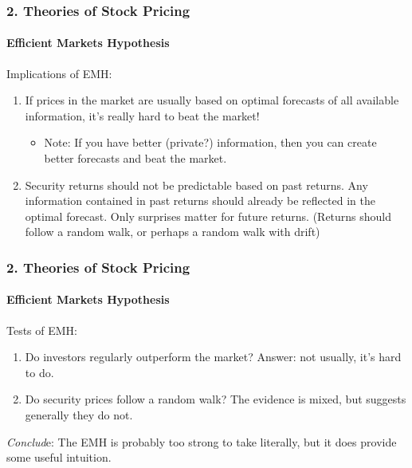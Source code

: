 \documentclass{beamer}
\begin{document}
\begin{frame}[t]
    \frametitle{2. Theories of Stock Pricing}
    \framesubtitle{Efficient Markets Hypothesis}

Implications of EMH:

    \begin{enumerate}
        \item If prices in the market are usually based on optimal forecasts of all available information, it’s really hard to beat the market!
        \begin{itemize}
            \item Note: If you have better (private?) information, then you can create better forecasts and beat the market.
        \end{itemize}
        \item Security returns should not be predictable based on past returns.   Any information contained in past returns should already be reflected in the optimal forecast.   Only surprises matter for future returns.   (Returns should follow a random walk, or perhaps a random walk with drift)
    \end{enumerate}

\end{frame}

\begin{frame}[t]
    \frametitle{2. Theories of Stock Pricing}
    \framesubtitle{Efficient Markets Hypothesis}

    Tests of EMH:

    \begin{enumerate}
        \item Do investors regularly outperform the market?  Answer: not usually, it’s hard to do.
        \item Do security prices follow a random walk?   The evidence is mixed, but suggests generally they do not.
    \end{enumerate}
    \vspace{1em}
    
    \textit{Conclud}e: The EMH is probably too strong to take literally, but it does provide some useful intuition.

\end{frame}
\end{document}
